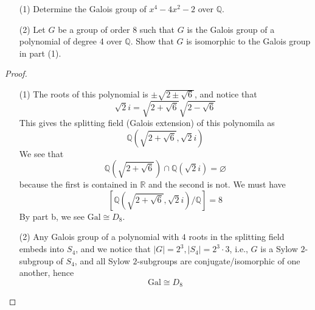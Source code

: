\documentclass[openany]{book}
\newcommand{\R}{\mathbb{R}}
\let\emptyset\varnothing
\newcommand{\Q}{\mathbb{Q}}
\begin{document}
\begin{prob}
    \begin{itemize}
        \item[(1)] Determine the Galois group of \(x^{4}-4x^{2}-2\) over \(\mathbb{Q}\).
        \item[(2)] Let \(G\) be a group of order 8 such that \(G\) is the Galois group of a polynomial of degree 4 over \(\mathbb{Q}\). Show that \(G\) is isomorphic to the Galois group in part (1).
    \end{itemize}
\end{prob}
\begin{proof}
    \begin{itemize}
        \item[(1)] The roots of this polynomial is $\pm\sqrt{2\pm\sqrt{6}}$, and notice that 
        \begin{equation*}
            \sqrt{2}i=\sqrt{2+\sqrt{6}}\sqrt{2-\sqrt{6}}
        \end{equation*}
        This gives the splitting field (Galois extension) of this polynomila as 
        \begin{equation*}
            \Q\left(\sqrt{2+\sqrt{6}}, \sqrt{2}i\right)
        \end{equation*}
        We see that 
        \begin{equation*}
            \Q\left(\sqrt{2+\sqrt{6}}\right)\cap\Q(\sqrt{2}i)=\emptyset
        \end{equation*}
        because the first is contained in $\R$ and the second is not. We must have 
        \begin{equation*}
            \left[ \Q\left(\sqrt{2+\sqrt{6}}, \sqrt{2}i\right)/\Q\right]=8
        \end{equation*}
        By part b, we see $\text{Gal}\cong D_8$.
        \item[(2)] Any Galois group of a polynomial with $4$ roots in the splitting field embeds into $S_4$, and we notice that $|G|=2^3, |S_4|=2^3\cdot 3$, i.e., $G$ is a Sylow $2$-subgroup of $S_4$, and all Sylow $2$-subgroups are conjugate/isomorphic of one another, hence 
        \begin{equation*}
            \text{Gal}\cong D_8
        \end{equation*}
    \end{itemize}
\end{proof}
\end{document}
